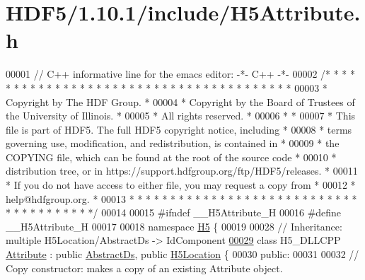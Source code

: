 \hypertarget{_h_d_f5_21_810_81_2include_2_h5_attribute_8h_source}{}\section{H\+D\+F5/1.10.1/include/\+H5\+Attribute.h}
\label{_h_d_f5_21_810_81_2include_2_h5_attribute_8h_source}

\begin{DoxyCode}
00001 \textcolor{comment}{// C++ informative line for the emacs editor: -*- C++ -*-}
00002 \textcolor{comment}{/* * * * * * * * * * * * * * * * * * * * * * * * * * * * * * * * * * * * * * *}
00003 \textcolor{comment}{ * Copyright by The HDF Group.                                               *}
00004 \textcolor{comment}{ * Copyright by the Board of Trustees of the University of Illinois.         *}
00005 \textcolor{comment}{ * All rights reserved.                                                      *}
00006 \textcolor{comment}{ *                                                                           *}
00007 \textcolor{comment}{ * This file is part of HDF5.  The full HDF5 copyright notice, including     *}
00008 \textcolor{comment}{ * terms governing use, modification, and redistribution, is contained in    *}
00009 \textcolor{comment}{ * the COPYING file, which can be found at the root of the source code       *}
00010 \textcolor{comment}{ * distribution tree, or in https://support.hdfgroup.org/ftp/HDF5/releases.  *}
00011 \textcolor{comment}{ * If you do not have access to either file, you may request a copy from     *}
00012 \textcolor{comment}{ * help@hdfgroup.org.                                                        *}
00013 \textcolor{comment}{ * * * * * * * * * * * * * * * * * * * * * * * * * * * * * * * * * * * * * * */}
00014 
00015 \textcolor{preprocessor}{#ifndef \_\_H5Attribute\_H}
00016 \textcolor{preprocessor}{#define \_\_H5Attribute\_H}
00017 
00018 \textcolor{keyword}{namespace }\hyperlink{namespace_h5}{H5} \{
00019 
00028 \textcolor{comment}{//  Inheritance: multiple H5Location/AbstractDs -> IdComponent}
\hyperlink{class_h5_1_1_attribute}{00029} \textcolor{keyword}{class }H5\_DLLCPP \hyperlink{class_h5_1_1_attribute}{Attribute} : \textcolor{keyword}{public} \hyperlink{class_h5_1_1_abstract_ds}{AbstractDs}, \textcolor{keyword}{public} 
      \hyperlink{class_h5_1_1_h5_location}{H5Location} \{
00030    \textcolor{keyword}{public}:
00031 
00032         \textcolor{comment}{// Copy constructor: makes a copy of an existing Attribute object.}

\end{DoxyCode}
